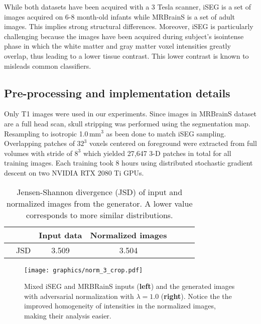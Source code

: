 \documentclass{article}
\begin{document}
While both datasets have been acquired with a 3 Tesla scanner, iSEG is a set of images acquired on 6-8 month-old infants while MRBrainS is a set of adult images. This implies strong structural differences. Moreover, iSEG is particularly challenging because the images have been acquired during subject's isointense phase in which the white matter and gray matter voxel intensities greatly overlap, thus leading to a lower tissue contrast. This lower contrast is known to misleads common classifiers.

\subsection{Pre-processing and implementation details}

Only T1 images were used in our experiments. Since images in MRBrainS dataset are a full head scan, skull stripping was performed using the segmentation map. Resampling to isotropic 1.0\,mm$^3$ as been done to match iSEG sampling. Overlapping patches of $32^3$ voxels centered on foreground were extracted from full volumes with stride of $8^3$ which yielded 27,647 3-D patches in total for all training images. Each training took 8 hours using distributed stochastic gradient descent on two NVIDIA RTX 2080 Ti GPUs.

\begin{table}[ht!]
  \centering
  \begin{small}
  \begin{tabular}{r*{6}{c}}
    \toprule
    &  & Input data & Normalized images \\
    \midrule
    & JSD & 3.509 & 3.504 \\
    \bottomrule
  \end{tabular}
  \end{small}
  \caption{Jensen-Shannon divergence (JSD) of input and normalized images from the generator. A lower value corresponds to more similar distributions.}\label{tlc}
\end{table}

\begin{figure}[ht!]
    \texttt{[image: graphics/norm\_3\_crop.pdf]}
    \caption{Mixed iSEG and MRBRainS inputs (\textbf{left}) and the generated images with adversarial normalization with $\lambda\!=\!1.0$ (\textbf{right}). Notice the the improved homogeneity of intensities in the normalized images, making their analysis easier.}\label{normalized}
\end{figure}
\end{document}
